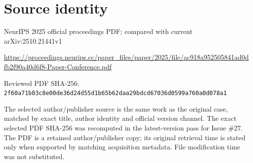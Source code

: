 \documentclass[11pt]{article}
\begin{document}
\section*{Source identity}

NeurIPS 2025 official proceedings PDF; compared with current arXiv:2510.21441v1

\url{https://proceedings.neurips.cc/paper_files/paper/2025/file/ac918a952505841ad0dfb2f90a40d6f8-Paper-Conference.pdf}

Reviewed PDF SHA-256: \nolinkurl{2f60a71b03c8e00de36d24d55d1b65b62daa29bdcd67036d0599a760a0d078a1}

The selected author/publisher source is the same work as the original case, matched by exact title, author identity and official version channel. The exact selected PDF SHA-256 was recomputed in the latest-version pass for Issue \#27. The PDF is a retained author/publisher copy; its original retrieval time is stated only when supported by matching acquisition metadata. File modification time was not substituted.
\end{document}
